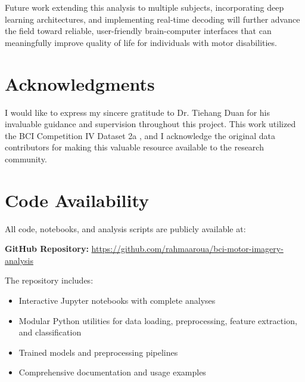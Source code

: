 \documentclass[11pt]{article}
\begin{document}
Future work extending this analysis to multiple subjects, incorporating deep learning architectures, and implementing real-time decoding will further advance the field toward reliable, user-friendly brain-computer interfaces that can meaningfully improve quality of life for individuals with motor disabilities.

\section*{Acknowledgments}

I would like to express my sincere gratitude to Dr. Tiehang Duan for his invaluable guidance and supervision throughout this project. This work utilized the BCI Competition IV Dataset 2a \citep{brunner2008bci,tangermann2012review}, and I acknowledge the original data contributors for making this valuable resource available to the research community.

\section*{Code Availability}

All code, notebooks, and analysis scripts are publicly available at:

\noindent\textbf{GitHub Repository:} \url{https://github.com/rahmaaroua/bci-motor-imagery-analysis}

The repository includes:
\begin{itemize}
    \item Interactive Jupyter notebooks with complete analyses
    \item Modular Python utilities for data loading, preprocessing, feature extraction, and classification
    \item Trained models and preprocessing pipelines
    \item Comprehensive documentation and usage examples
\end{itemize}
\end{document}
